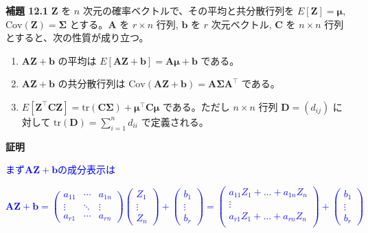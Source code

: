 \documentclass{article}
\begin{document}
\textbf{補題 12.1} $\bm{Z}$ を $n$ 次元の確率ベクトルで、その平均と共分散行列を $E[\bm{Z}] = \bm{\mu}$, $\mathrm{Cov}(\bm{Z}) = \bm{\Sigma}$ とする。$\bm{A}$ を $r \times n$ 行列, $\bm{b}$ を $r$ 次元ベクトル, $\bm{C}$ を $n \times n$ 行列とすると、次の性質が成り立つ。

\begin{enumerate}
    \item $\bm{A}\bm{Z} + \bm{b}$ の平均は $E[\bm{A}\bm{Z} + \bm{b}] = \bm{A}\bm{\mu} + \bm{b}$ である。
    \item $\bm{A}\bm{Z} + \bm{b}$ の共分散行列は $\mathrm{Cov}(\bm{A}\bm{Z} + \bm{b}) = \bm{A}\bm{\Sigma}\bm{A}^\top$ である。
    \item $E[\bm{Z}^\top \bm{C} \bm{Z}] = \mathrm{tr}(\bm{C}\bm{\Sigma}) + \bm{\mu}^\top \bm{C} \bm{\mu}$ である。ただし $n \times n$ 行列 $\bm{D} = (d_{ij})$ に対して $\mathrm{tr}(\bm{D}) = \sum_{i=1}^n d_{ii}$ で定義される。
\end{enumerate}

\bigskip


\textbf{証明} 

\textcolor{blue}{まず$\bm{A}\bm{Z} + \bm{b}$の成分表示は}


\textcolor{blue}{\begin{equation*}
  \bm{A}\bm{Z} + \bm{b}=  
  \begin{pmatrix}
  a_{11} & \cdots & a_{1n} \\
  \vdots & \ddots & \vdots \\
  a_{r1} & \cdots & a_{rn}
  \end{pmatrix}
  \begin{pmatrix}
    Z_1 \\
    \vdots \\
    Z_n
  \end{pmatrix}
  + 
  \begin{pmatrix}
    b_1 \\
    \vdots \\
    b_r
  \end{pmatrix}
  =
  \begin{pmatrix}
    a_{11} Z_1 + \dots + a_{1n}Z_n \\
    \vdots \\
    a_{r1} Z_1 + \dots + a_{rn}Z_n \\
  \end{pmatrix}
  + 
  \begin{pmatrix}
    b_1 \\
    \vdots \\
    b_r
  \end{pmatrix}
\end{equation*}}
\end{document}
